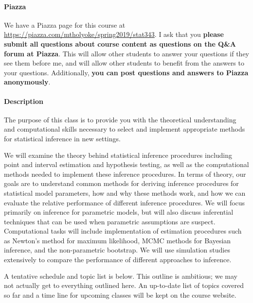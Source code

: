 \documentclass[11pt]{article}
\begin{document}
\paragraph{Piazza}

We have a Piazza page for this course at \url{https://piazza.com/mtholyoke/spring2019/stat343}.  I ask that you \textbf{please submit all questions about course content as questions on the Q{\&}A forum at Piazza}.  This will allow other students to answer your questions if they see them before me, and will allow other students to benefit from the answers to your questions.  Additionally, \textbf{you can post questions and answers to Piazza anonymously}.

\paragraph{Description}

The purpose of this class is to provide you with the theoretical understanding and computational skills necessary to select and implement appropriate methods for statistical inference in new settings.

We will examine the theory behind statistical inference procedures including point and interval estimation and hypothesis testing, as well as the computational methods needed to implement these inference procedures.  In terms of theory, our goals are to understand common methods for deriving inference procedures for statistical model parameters, how and why these methods work, and how we can evaluate the relative performance of different inference procedures.  We will focus primarily on inference for parametric models, but will also discuss inferential techniques that can be used when parametric assumptions are suspect.  Computational tasks will include implementation of estimation procedures such as Newton's method for maximum likelihood, MCMC methods for Bayesian inference, and the non-parametric bootstrap.  We will use simulation studies extensively to compare the performance of different approaches to inference.

A tentative schedule and topic list is below.  This outline is ambitious; we may not actually get to everything outlined here.  An up-to-date list of topics covered so far and a time line for upcoming classes will be kept on the course website.
\end{document}
